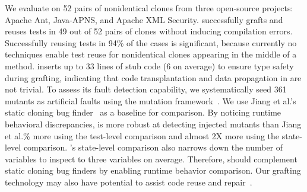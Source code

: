 We evaluate {\grafter} on 52 pairs of nonidentical clones from three open-source projects: Apache Ant, Java-APNS, and Apache XML Security. %
 {\grafter} successfully grafts and reuses tests in 49 out of 52 pairs of clones without inducing compilation errors. Successfully reusing tests in 94\% of the cases is significant, because currently no techniques enable test reuse for nonidentical clones appearing in the middle of a method. {\grafter} inserts up to 33 lines of stub code (6 on average) to ensure type safety during grafting, indicating that code transplantation and data propagation in {\grafter} are not trivial. To assess its fault detection capability, we systematically seed 361 mutants as artificial faults using the {\major} mutation framework~\cite{just2014major}. We use Jiang et al.'s static cloning bug finder~\cite{Jiang2007} as a baseline for comparison. 
By noticing runtime behavioral discrepancies, {\grafter} is more robust at detecting injected mutants than Jiang et al.\% more using the test-level comparison and almost 2X more using the state-level comparison. {\grafter}'s state-level comparison also narrows down the number of variables to inspect to three variables on average. Therefore, {\grafter} should complement static cloning bug finders by enabling runtime behavior comparison. Our grafting technology may also have potential to assist code reuse and repair~\cite{weimer2009automatically, Barr2015AST, petke2014using, harman2014babel}. 
